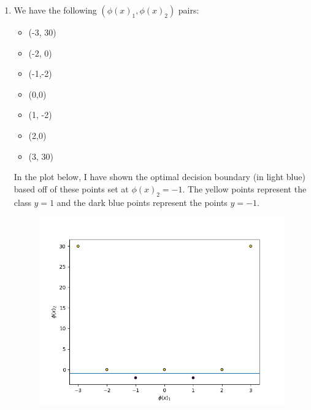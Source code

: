 \documentclass[submit]{harvardml}
\begin{document}
\begin{enumerate}
    \item 
    We have the following $(\phi(x)_1, \phi(x)_2)$ pairs:
    \begin{itemize}
        \item (-3, 30)
        \item (-2, 0)
        \item (-1,-2)
        \item (0,0) 
        \item(1, -2) 
        \item (2,0) 
         \item (3, 30)
    \end{itemize}
    In the plot below, I have shown the optimal decision boundary (in light blue) based off of these points set at $\phi(x)_2 = -1$. The yellow points represent the class $y = 1$ and the dark blue points represent the points $y = -1$.
    
    \begin{figure}
        \centering
        \includegraphics[height=0.4\textheight]{HW4/P1part1plot.png}
    \end{figure}
    

\end{enumerate}
\end{document}
